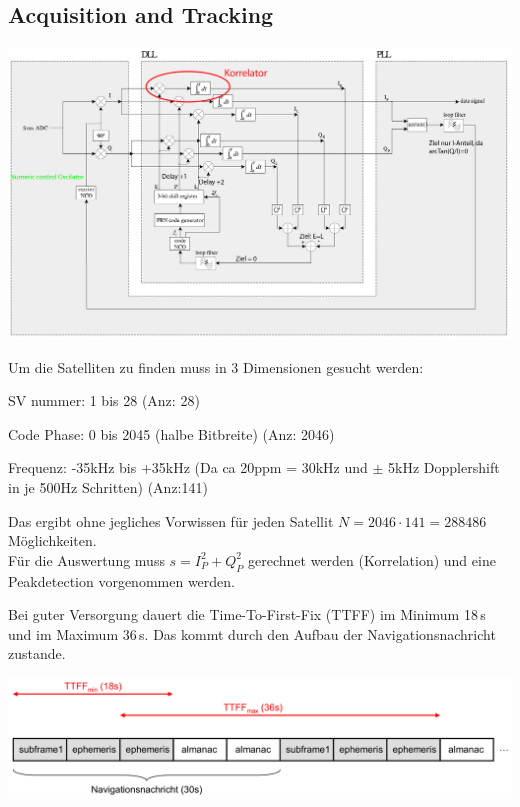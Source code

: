 \subsection{Acquisition and Tracking}

	\begin{center}
    	\includegraphics[width=14cm]{./bilder/GPS-Phasenlock.jpg}\\
    \end{center}

	Um die Satelliten zu finden muss in 3 Dimensionen gesucht werden:
	\begin{liste}
    	\item SV nummer: 	1 bis 28 (Anz: 28)
    	\item Code Phase: 	0 bis 2045 (halbe Bitbreite) (Anz: 2046)
    	\item Frequenz:		-35kHz bis +35kHz (Da ca 20ppm = 30kHz und $\pm$ 5kHz
    	Dopplershift in je 500Hz Schritten) (Anz:141)
    \end{liste}
	Das ergibt ohne jegliches Vorwissen für jeden Satellit $N=2046\cdot
	141=288486$ Möglichkeiten.\\
	Für die Auswertung muss $s=I_P^2+Q_P^2$ gerechnet werden (Korrelation) und eine
	Peakdetection vorgenommen werden.
	
	Bei guter Versorgung dauert die Time-To-First-Fix (TTFF) im Minimum 18\,s und im Maximum 36\,s.
	Das kommt durch den Aufbau der Navigationsnachricht zustande. \\
	\begin{minipage}{14cm}
	    \includegraphics[width=14cm]{./bilder/GPS-ttff.png}
    \end{minipage}
	
